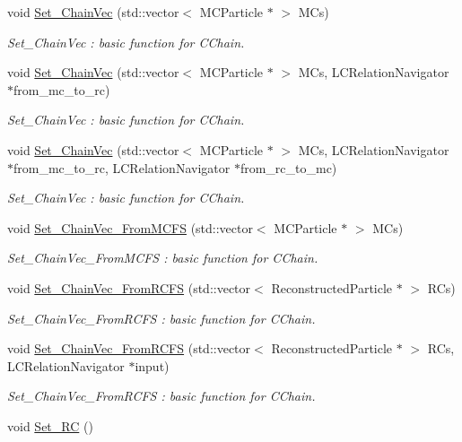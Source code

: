 \begin{DoxyCompactItemize}
void \hyperlink{classToolSet_1_1CChain__Vec_a855f3bc2ba6a30a7773ed7e8156d1823}{Set\_\-ChainVec} (std::vector$<$ MCParticle $\ast$ $>$ MCs)
\begin{DoxyCompactList}\small\item\em Set\_\-ChainVec : basic function for CChain. \item\end{DoxyCompactList}\item 
void \hyperlink{classToolSet_1_1CChain__Vec_a30f79cdea8e84210e77e849722f59d2f}{Set\_\-ChainVec} (std::vector$<$ MCParticle $\ast$ $>$ MCs, LCRelationNavigator $\ast$from\_\-mc\_\-to\_\-rc)
\begin{DoxyCompactList}\small\item\em Set\_\-ChainVec : basic function for CChain. \item\end{DoxyCompactList}\item 
void \hyperlink{classToolSet_1_1CChain__Vec_ab517a961cbc4260575cd6531d26381fe}{Set\_\-ChainVec} (std::vector$<$ MCParticle $\ast$ $>$ MCs, LCRelationNavigator $\ast$from\_\-mc\_\-to\_\-rc, LCRelationNavigator $\ast$from\_\-rc\_\-to\_\-mc)
\begin{DoxyCompactList}\small\item\em Set\_\-ChainVec : basic function for CChain. \item\end{DoxyCompactList}\item 
void \hyperlink{classToolSet_1_1CChain__Vec_a941c5442fabf3407af54076e0d706887}{Set\_\-ChainVec\_\-FromMCFS} (std::vector$<$ MCParticle $\ast$ $>$ MCs)
\begin{DoxyCompactList}\small\item\em Set\_\-ChainVec\_\-FromMCFS : basic function for CChain. \item\end{DoxyCompactList}\item 
void \hyperlink{classToolSet_1_1CChain__Vec_a869d89522896a4eff5d7f129859aeeb3}{Set\_\-ChainVec\_\-FromRCFS} (std::vector$<$ ReconstructedParticle $\ast$ $>$ RCs)
\begin{DoxyCompactList}\small\item\em Set\_\-ChainVec\_\-FromRCFS : basic function for CChain. \item\end{DoxyCompactList}\item 
void \hyperlink{classToolSet_1_1CChain__Vec_a83e4a3636e16dd58daad83530da96eab}{Set\_\-ChainVec\_\-FromRCFS} (std::vector$<$ ReconstructedParticle $\ast$ $>$ RCs, LCRelationNavigator $\ast$input)
\begin{DoxyCompactList}\small\item\em Set\_\-ChainVec\_\-FromRCFS : basic function for CChain. \item\end{DoxyCompactList}\item 
\hypertarget{classToolSet_1_1CChain__Vec_acc86badcebf1e4026f3d4ae2e85bd5ad}{
void \hyperlink{classToolSet_1_1CChain__Vec_acc86badcebf1e4026f3d4ae2e85bd5ad}{Set\_\-RC} ()}
\label{classToolSet_1_1CChain__Vec_acc86badcebf1e4026f3d4ae2e85bd5ad}


\end{DoxyCompactItemize}
